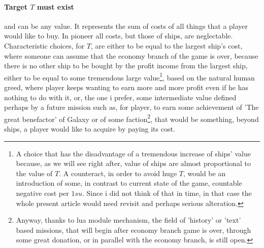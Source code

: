 \documentclass[]{article}
\begin{document}
\paragraph*{Target $T$ must exist} and can be any value. It represents the sum of costs of all things that a player would like to buy. In pioneer all costs, but those of ships, are neglectable. Characteristic choices, for $T$, are either to be equal to the largest ship's cost, where someone can assume that the economy branch of the game is over, because there is no other ship to be bought by the profit income from the largest ship, either to be equal to some tremendous large value\footnote{A choice that has the disadvantage of a tremendous increase of ships’ value because, as we will see right after, value of ships are almost proportional to the value of $T.$ A counteract, in order to avoid huge $T$, would be an introduction of some, in contrast to current state of the game, countable negative cost per $1su$. Since i did not think of that in time, in that case the whole present article would need revisit and perhaps serious alteration.}, based on the natural human greed, where player keeps wanting to earn more and more profit even if he has nothing to do with it, or, the one i prefer, some intermediate value defined perhaps by a future mission such as, for player, to earn some achievement of 'The great benefactor' of Galaxy or of some faction\footnote{Anyway, thanks to lua module mechanism, the field of 'history' or 'text' based missions, that will begin after economy branch game is over, through some great donation, or in parallel with the economy branch, is still open.}, that would be something, beyond ships, a player would like to acquire by paying its cost.
\end{document}
